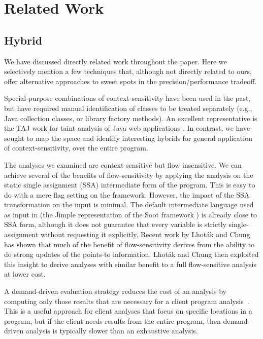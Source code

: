 \chapter{Related Work}\label{chapter:related}

\section{Hybrid}

We have discussed directly related work throughout the paper. Here we
selectively mention a few techniques that, although not directly
related to ours, offer alternative approaches to sweet spots in the
precision/performance tradeoff.

Special-purpose combinations of context-sensitivity have been used in
the past, but have required manual identification of classes to be
treated separately (e.g., Java collection classes, or library factory
methods). An excellent representative is the TAJ work for taint
analysis of Java web applications
\cite{pldi:2009:Tripp}. In contrast, we have sought to
map the space and identify interesting hybrids for general application
of context-sensitivity, over the entire program.

The analyses we examined are context-sensitive but flow-insensitive.
We can achieve several of the benefits of flow-sensitivity by applying
the analysis on the static single assignment (SSA) intermediate form
of the program. This is easy to do with a mere flag setting on the
\doop{} framework. However, the impact of the SSA transformation
on the input is minimal. The default intermediate language used as
input in \doop{} (the Jimple representation of the Soot
framework \cite{cascon:1999:Vall,cc:2000:Vall}) is already close to
SSA form, although it does not guarantee that every variable is
strictly single-assignment without requesting it explicitly.  Recent
work by Lhot\'{a}k and Chung \cite{popl:2011:Lhotak} has shown that
much of the benefit of flow-sensitivity derives from the ability to do
strong updates of the points-to information. Lhot\'{a}k and Chung then
exploited this insight to derive analyses with similar benefit to a
full flow-sensitive analysis at lower cost.

A demand-driven evaluation strategy reduces the cost of an analysis by
computing only those results that are necessary for a client program
analysis~\cite{oopsla:2005:Sridharan,pldi:2006:Sridharan,popl:2008:Zheng,pldi:2001:Heintze}. This is a useful
approach for client analyses that focus on specific locations in a
program, but if the client needs results from the entire program, then
demand-driven analysis is typically slower than an exhaustive
analysis.

